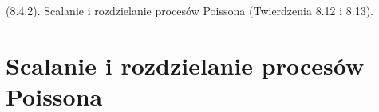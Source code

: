 {
\makeatletter
{}
\makeatother
\graphicspath{{../probabil}}

\begin{questiontext}
	(8.4.2). Scalanie i rozdzielanie procesów Poissona (Twierdzenia 8.12 i 8.13).
\end{questiontext}

\section{Scalanie i rozdzielanie procesów Poissona}

}